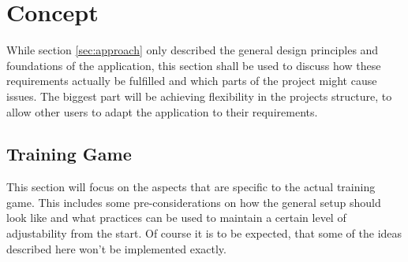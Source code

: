 \documentclass[a4paper,11pt]{article}%
\renewcommand{\\}{\vspace*{0.5\baselineskip} \newline}
\begin{document}


\section{Concept}
\label{sec:concept}
While section \ref{sec:approach} only described the general design principles and foundations of the application, this section shall be used to discuss how these requirements  actually be fulfilled and which parts of the project might cause issues.
\newline
\newline
The biggest part will be achieving flexibility in the projects structure, to allow other users to adapt the application to their requirements.


\subsection{Training Game}
This section will focus on the aspects that are specific to the actual training game. This includes some pre-considerations on how the general setup should look like and what practices can be used to maintain a certain level of adjustability from the start. Of course it is to be expected, that some of the ideas described here won't be implemented exactly.
\end{document}
